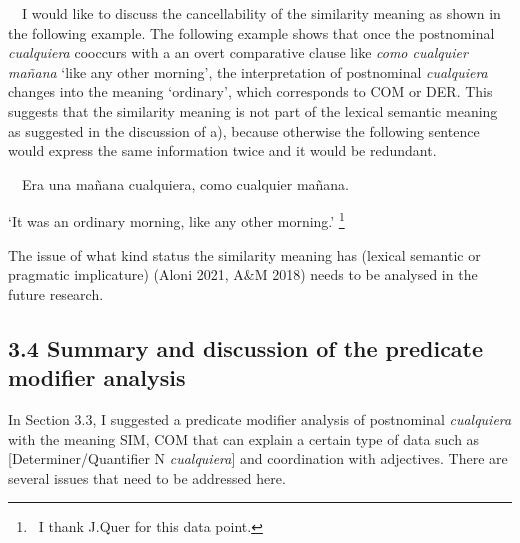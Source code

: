 \begin{styleStandard}
\ \ I would like to discuss the cancellability of the similarity meaning as shown in the following example. The following example shows that once the postnominal \textit{cualquiera} cooccurs with a an overt comparative clause like \textit{como cualquier mañana} ‘like any other morning’, the interpretation of postnominal \textit{cualquiera} changes into the meaning ‘ordinary’, which corresponds to COM or DER. This suggests that the similarity meaning is not part of the lexical semantic meaning as suggested in the discussion of a), because otherwise the following sentence would express the same information twice and it would be redundant. \ \ 
\end{styleStandard}

\begin{styleStandard}
\ \ Era una mañana cualquiera, como cualquier mañana. 
\end{styleStandard}

\begin{styleStandard}
‘It was an ordinary morning, like any other morning.’ \footnote{\textrm{\ I thank J.Quer for this data point. }\par }\ \ \ 
\end{styleStandard}

\begin{styleStandard}
The issue of what kind status the similarity meaning has (lexical semantic or pragmatic implicature) (Aloni 2021, A\&M 2018) needs to be analysed in the future research.
\end{styleStandard}

\subsection[3.4 Summary and discussion of the predicate modifier analysis]{\textbf{3.4 Summary and discussion of the predicate modifier analysis}}
\begin{styleStandard}
In Section 3.3, I suggested a predicate modifier analysis of postnominal \textit{cualquiera} with the meaning SIM, COM that can explain a certain type of data such as [Determiner/Quantifier N \textit{cualquiera}] and coordination with adjectives. There are several issues that need to be addressed here.
\end{styleStandard}

